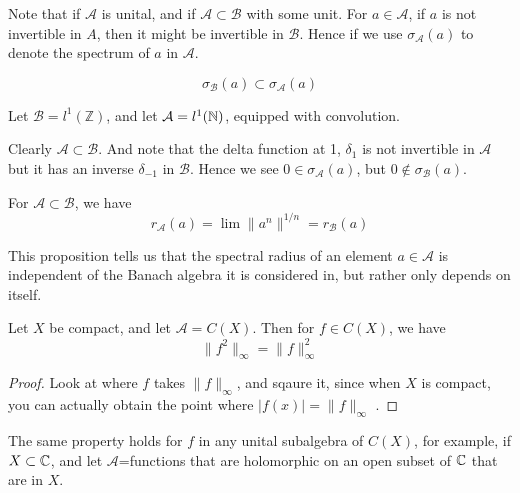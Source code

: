 Note that 
if $\mathcal{A}$ is unital, and if $\mathcal{A}\subset\mathcal{B}$ with some unit. For $a\in\mathcal{A}$, if $a$ is not invertible in $A$, then it might be invertible in $\mathcal{B}$. Hence if we use $\sigma_\mathcal{A}(a)$ to denote the spectrum of $a$ in $\mathcal{A}$.
\begin{proposition}
    \begin{equation*}
        \sigma_\mathcal{B}(a)\subset \sigma_\mathcal{A}(a)
    \end{equation*}
\end{proposition}


\begin{example}
    Let $\mathcal{B}=l^1(\mathbb{Z})$, and let $\mathcal{A}=l^1(\mathbb{N})$, equipped with convolution. 
    
    Clearly $\mathcal{A}\subset\mathcal{B}$. And note that the delta function at 1, $\delta_1$ is not invertible in $\mathcal{A}$ but it has an inverse $\delta_{-1}$ in $\mathcal{B}$. Hence we see $0\in\sigma_\mathcal{A}(a)$, but $0\not\in\sigma_\mathcal{B}(a)$.


\end{example}

\begin{proposition}
    For $\mathcal{A}\subset\mathcal{B}$, we have
    \begin{equation*}
        r_\mathcal{A}(a)=\lim\|a^n\|^{1/n}=r_\mathcal{B}(a)
    \end{equation*}
\end{proposition}
This proposition tells us that the spectral radius of an element $a\in\mathcal{A}$ is independent of the Banach algebra it is considered in, but rather only depends on itself.

\begin{proposition}
    Let $X$ be compact, and let $\mathcal{A}=C(X)$. Then for $f\in C(X)$, we have
    \begin{equation*}
        \|f^2\|_\infty=\|f\|_\infty^2
    \end{equation*}
\end{proposition}
\begin{proof}
    Look at where $f$ takes $\|f\|_\infty$, and sqaure it, since when $X$ is compact, you can actually obtain the point where $|f(x)|=\|f\|_\infty$ .
\end{proof}

\begin{remark}
The same property holds for $f$ in any unital subalgebra of $C(X)$, for example, if $X\subset\mathbb{C}$, and let $\mathcal{A}$=functions that are holomorphic on an open subset of $\mathbb{C}$ that are in $X$.
\end{remark}

